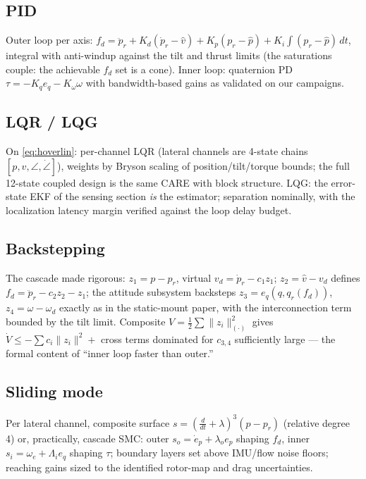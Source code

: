 \documentclass[conference]{IEEEtran}
\begin{document}
\subsection{PID}
Outer loop per axis:
$f_d = \ddot p_r + K_d(\dot p_r - \hat v) + K_p(p_r - \hat p) + K_i\!\int(p_r-\hat p)\,dt$,
integral with anti-windup against the tilt and thrust limits (the saturations couple: the achievable $f_d$ set is a cone). Inner loop: quaternion PD $\tau = -K_q e_q - K_\omega\omega$ with bandwidth-based gains as validated on our campaigns.

\subsection{LQR / LQG}
On \eqref{eq:hoverlin}: per-channel LQR (lateral channels are 4-state chains $[p, v, \angle, \dot\angle]$), weights by Bryson scaling of position/tilt/torque bounds; the full 12-state coupled design is the same CARE with block structure. LQG: the error-state EKF of the sensing section \emph{is} the estimator; separation nominally, with the localization latency margin verified against the loop delay budget.

\subsection{Backstepping}
The cascade made rigorous: $z_1 = p - p_r$, virtual $v_d = \dot p_r - c_1 z_1$; $z_2 = \hat v - v_d$ defines $f_d = \ddot p_r - c_2 z_2 - z_1$; the attitude subsystem backsteps $z_3 = e_q(q, q_r(f_d))$, $z_4 = \omega - \omega_d$ exactly as in the static-mount paper, with the interconnection term bounded by the tilt limit. Composite $V = \tfrac12\sum\|z_i\|^2_{(\cdot)}$ gives $\dot V \le -\sum c_i\|z_i\|^2 + $ cross terms dominated for $c_{3,4}$ sufficiently large --- the formal content of ``inner loop faster than outer.''

\subsection{Sliding mode}
Per lateral channel, composite surface $s = (\tfrac{d}{dt} + \lambda)^{3}(p - p_r)$ (relative degree 4) or, practically, cascade SMC: outer $s_o = \dot e_p + \lambda_o e_p$ shaping $f_d$, inner $s_i = \omega_e + \Lambda_i e_q$ shaping $\tau$; boundary layers set above IMU/flow noise floors; reaching gains sized to the identified rotor-map and drag uncertainties.
\end{document}
